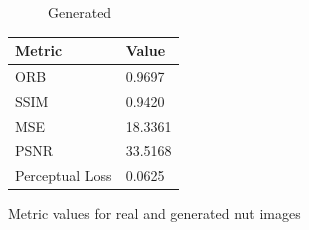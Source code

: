 \documentclass[12pt,DIV14,BCOR12mm,a4paper,footinclude=false,headinclude,parskip=half-,twoside,openright,cleardoublepage=empty,toc=index,bibliography=totoc,listof=totoc]{scrreprt}
\numberwithin{equation}{chapter}
\begin{document}
\begin{figure}
\begin{minipage}[H]{\linewidth}
\begin{minipage}[H]{0.5\linewidth}
\begin{subfigure}[t]{0.48\linewidth}
                \caption{Generated}
            \end{subfigure}
        \end{minipage}%
        \hfill
        \begin{minipage}[H]{0.5\linewidth} %
            \centering
            \small
            \begin{tabular}{p{3cm} p{2cm}}
                \toprule
                \textbf{Metric} & \textbf{Value} \\
                \midrule
                ORB             & 0.9697        \\
                SSIM            & 0.9420        \\
                MSE             & 18.3361       \\
                PSNR            & 33.5168       \\
                Perceptual Loss & 0.0625        \\
                \bottomrule
            \end{tabular}
        \end{minipage}%
        \caption{Metric values for real and generated nut images}
        \label{fig:comparison_metrics_real_generated_nut}
    \end{minipage}
\end{figure}
\end{document}
